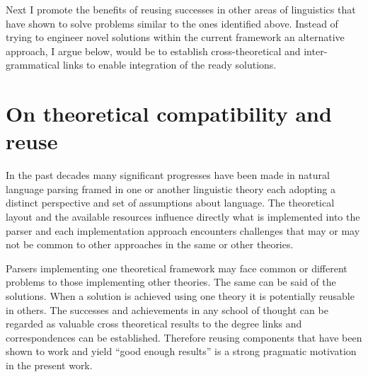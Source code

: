 Next I promote the benefits of reusing successes in other areas of linguistics that have shown to solve problems similar to the ones identified above. Instead of trying to engineer novel solutions within the current framework an alternative approach, I argue below, would be to establish cross-theoretical and inter-grammatical links to enable integration of the ready solutions. 



\section{On theoretical compatibility and reuse}
\label{sec:reuse}
In the past decades many significant progresses have been made in natural language parsing framed in one or another linguistic theory each adopting a distinct perspective and set of assumptions about language. The theoretical layout and the available resources influence directly what is implemented into the parser and each implementation approach encounters challenges that may or may not be common to other approaches in the same or other theories. 

Parsers implementing one theoretical framework may face common or different problems to those implementing other theories. The same can be said of the solutions. When a solution is achieved using one theory it is potentially reusable in others. The successes and achievements in any school of thought can be regarded as valuable cross theoretical results to the degree links and correspondences can be established. Therefore reusing components that have been shown to work and yield ``good enough results'' is a strong pragmatic motivation in the present work.

